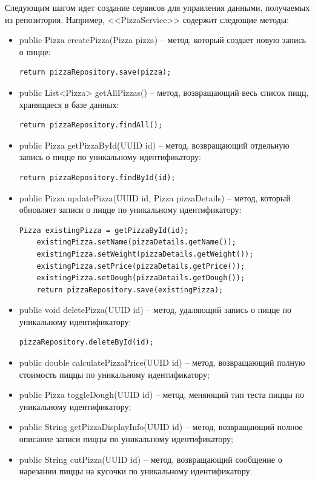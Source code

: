 \documentclass[a4paper,14pt]{extarticle}
\begin{document}
Следующим шагом идет создание сервисов для управления данными, получаемых из репозитория. Например, <<PizzaService>> содержит следющие методы:
\begin{itemize}
  \item[--]public Pizza createPizza(Pizza pizza) -- метод, который создает новую запись о пицце:
  \begin{Verbatim}[tabsize=4]
    return pizzaRepository.save(pizza);
  \end{Verbatim}
  \item[--]public List<Pizza> getAllPizzas() -- метод, возвращающий весь список пицц, хранящаеся в базе данных:
  \begin{Verbatim}[tabsize=4]
    return pizzaRepository.findAll();
  \end{Verbatim}
  \item[--] public Pizza getPizzaById(UUID id) -- метод, возвращающий отдельную запись о пицце по уникальному идентификатору:
  \begin{Verbatim}[tabsize=4]
    return pizzaRepository.findById(id);
  \end{Verbatim}
  \item[--] public Pizza updatePizza(UUID id, Pizza pizzaDetails) -- метод, который обновляет записи о пицце по уникальному идентификатору:
  \begin{Verbatim}[tabsize=4]
    Pizza existingPizza = getPizzaById(id);
    existingPizza.setName(pizzaDetails.getName());
    existingPizza.setWeight(pizzaDetails.getWeight());
    existingPizza.setPrice(pizzaDetails.getPrice());
    existingPizza.setDough(pizzaDetails.getDough());
    return pizzaRepository.save(existingPizza);
  \end{Verbatim}
  \item[--] public void deletePizza(UUID id) -- метод, удаляющий запись о пицце по уникальному идентификатору:
  \begin{Verbatim}[tabsize=4]
    pizzaRepository.deleteById(id);
  \end{Verbatim}
  \item[--] public double calculatePizzaPrice(UUID id) -- метод, возвращающий полную стоимость пиццы по уникальному идентификатору;
  \item[--] public Pizza toggleDough(UUID id) -- метод, меняющий тип теста пиццы по уникальному идентификатору;
  \item[--] public String getPizzaDisplayInfo(UUID id) -- метод, возвращающий полное описание записи пиццы по уникальному идентификатору;
  \item[--] public String cutPizza(UUID id) -- метод, возвращающий сообщение о нарезании пиццы на кусочки по уникальному идентификатору.
\end{itemize}
\end{document}
